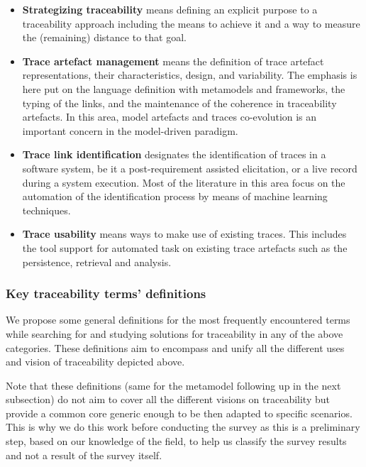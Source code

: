 \begin{itemize}
	\item \textbf{Strategizing traceability} means defining an explicit purpose to a traceability approach including the means to achieve it and a way to measure the (remaining) distance to that goal. 
	\item \textbf{Trace artefact management} means the definition of trace artefact representations, their characteristics, design, and variability. The emphasis is here put on the language definition with metamodels and frameworks, the typing of the links, and the maintenance of the coherence in traceability artefacts. In this area, model artefacts and traces co-evolution is an important concern in the model-driven paradigm.
	\item \textbf{Trace link identification} designates the identification of traces in a software system, be it a post-requirement assisted elicitation, or a live record during a system execution. Most of the literature in this area focus on the automation of the identification process by means of machine learning techniques.
	\item \textbf{Trace usability} means ways to make use of existing traces. This includes the tool support for automated task on existing trace artefacts such as the persistence, retrieval and analysis.
\end{itemize}



\subsubsection{Key traceability terms' definitions}
We propose some general definitions for the most frequently encountered terms while searching for and studying solutions for traceability in any of the above categories. These definitions aim to encompass and unify all the different uses and vision of traceability depicted above. 

Note that these definitions (same for the metamodel following up in the next subsection) do not aim to cover all the different visions on traceability but provide a common core generic enough to be then adapted to specific scenarios. This is why we do this work before conducting the survey as this is a preliminary step, based on our knowledge of the field, to help us classify the survey results and not a result of the survey itself.


